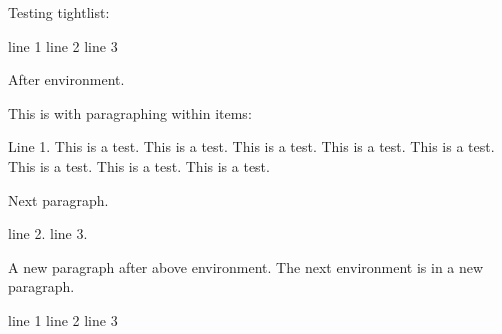 Testing tightlist:
\begin{tightlist}
\li line 1
\li line 2
\li line 3
\end{tightlist}
After environment.

This is with paragraphing within items:
\begin{tightlist}
\li Line 1. 
This is a test. This is a test. This is a test. This is a test. 
This is a test. This is a test. This is a test. This is a test. 

Next paragraph.
\lipsum[1]

\li line 2.
\li line 3.
\end{tightlist}

A new paragraph after above environment.
The next environment is in a new paragraph.

\begin{tightlist}
\li line 1
\li line 2
\li line 3
\end{tightlist}
